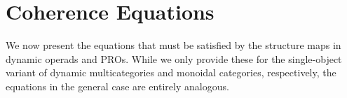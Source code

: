 \documentclass[11pt, one side, article]{memoir}
\theoremstyle{definition}
\theoremstyle{plain}
\newtheorem{theorem}[definitionx]{Theorem}
\newcommand{\0}{\textsf{0}}
\newcommand{\1}{\tn{\textsf{1}}}
\newcommand{\bnote}[1]{{\color{red}Brandon says:}~#1\quad{\color{red}$\lozenge$}}
\begin{document}
%
%
%
%




\appendix
\chapter{Coherence Equations}\label{coherences}


We now present the equations that must be satisfied by the structure maps in dynamic operads and PROs. While we only provide these for the single-object variant of dynamic multicategories and monoidal categories, respectively, the equations in the general case are entirely analogous.
\end{document}
